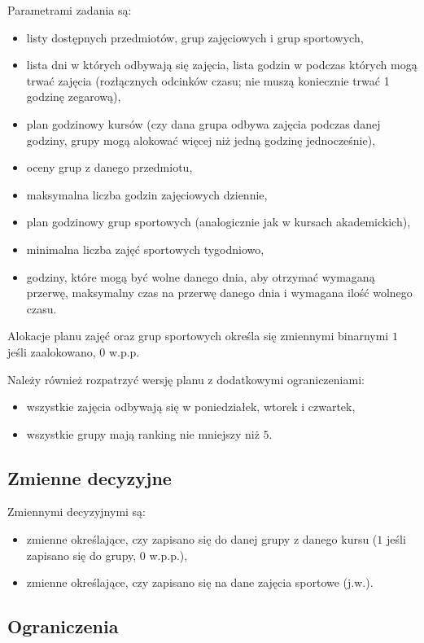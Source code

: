 \documentclass[polish,12pt,titlepage]{article}
\begin{document}
Parametrami zadania są:
\begin{itemize}
    \item listy dostępnych przedmiotów, grup zajęciowych i grup sportowych,
    \item lista dni w których odbywają się zajęcia, lista godzin w podczas których mogą trwać zajęcia (rozłącznych odcinków czasu; nie muszą koniecznie trwać 1 godzinę zegarową),
    \item plan godzinowy kursów (czy dana grupa odbywa zajęcia podczas danej godziny, grupy mogą alokować więcej niż jedną godzinę jednocześnie),
    \item oceny grup z danego przedmiotu,
    \item maksymalna liczba godzin zajęciowych dziennie,
    \item plan godzinowy grup sportowych (analogicznie jak w kursach akademickich),
    \item minimalna liczba zajęć sportowych tygodniowo,
    \item godziny, które mogą być wolne danego dnia, aby otrzymać wymaganą przerwę, maksymalny czas na przerwę danego dnia i wymagana ilość wolnego czasu.
\end{itemize}

Alokacje planu zajęć oraz grup sportowych określa się zmiennymi binarnymi {$1$ jeśli zaalokowano, $0$ w.p.p}.

Należy również rozpatrzyć wersję planu z dodatkowymi ograniczeniami:
\begin{itemize}
    \item wszystkie zajęcia odbywają się w poniedziałek, wtorek i czwartek,
    \item wszystkie grupy mają ranking nie mniejszy niż $5$.
\end{itemize}

\subsection{Zmienne decyzyjne}

Zmiennymi decyzyjnymi są:
\begin{itemize}
    \item zmienne określające, czy zapisano się do danej grupy z danego kursu ($1$ jeśli zapisano się do grupy, $0$ w.p.p.),
    \item zmienne określające, czy zapisano się na dane zajęcia sportowe (j.w.).
\end{itemize}

\subsection{Ograniczenia}
\end{document}
